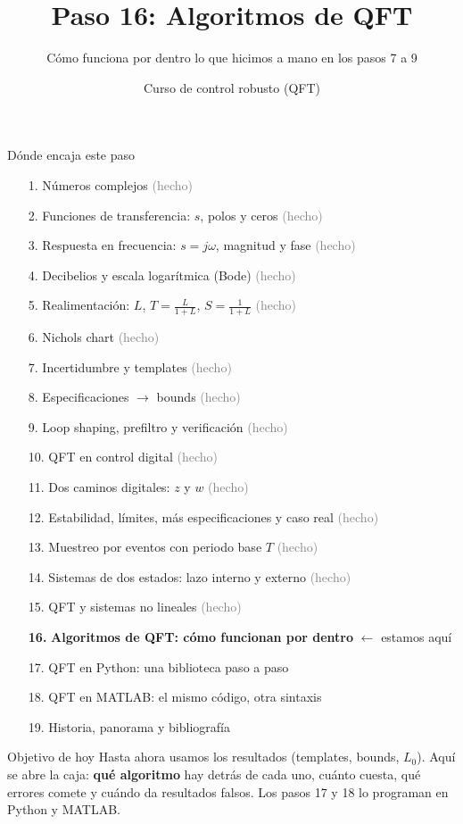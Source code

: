 \documentclass[aspectratio=169,11pt]{beamer}
\title[Algoritmos de QFT]{Paso 16: Algoritmos de QFT}
\subtitle{Cómo funciona por dentro lo que hicimos a mano en los pasos 7 a 9}
\author{Curso de control robusto (QFT)}
\date{}
\begin{document}
\begin{frame}\titlepage\end{frame}

\begin{frame}{Dónde encaja este paso}
  \tiny
  \begin{enumerate}\setlength{\itemsep}{-2pt}
    \item[1.] Números complejos \hfill \textcolor{gray}{(hecho)}
    \item[2.] Funciones de transferencia: $s$, polos y ceros \hfill \textcolor{gray}{(hecho)}
    \item[3.] Respuesta en frecuencia: $s=j\omega$, magnitud y fase \hfill \textcolor{gray}{(hecho)}
    \item[4.] Decibelios y escala logarítmica (Bode) \hfill \textcolor{gray}{(hecho)}
    \item[5.] Realimentación: $L$, $T=\frac{L}{1+L}$, $S=\frac{1}{1+L}$ \hfill \textcolor{gray}{(hecho)}
    \item[6.] Nichols chart \hfill \textcolor{gray}{(hecho)}
    \item[7.] Incertidumbre y templates \hfill \textcolor{gray}{(hecho)}
    \item[8.] Especificaciones $\rightarrow$ bounds \hfill \textcolor{gray}{(hecho)}
    \item[9.] Loop shaping, prefiltro y verificación \hfill \textcolor{gray}{(hecho)}
    \item[10.] QFT en control digital \hfill \textcolor{gray}{(hecho)}
    \item[11.] Dos caminos digitales: $z$ y $w$ \hfill \textcolor{gray}{(hecho)}
    \item[12.] Estabilidad, límites, más especificaciones y caso real \hfill \textcolor{gray}{(hecho)}
    \item[13.] Muestreo por eventos con periodo base $T$ \hfill \textcolor{gray}{(hecho)}
    \item[14.] Sistemas de dos estados: lazo interno y externo \hfill \textcolor{gray}{(hecho)}
    \item[15.] QFT y sistemas no lineales \hfill \textcolor{gray}{(hecho)}
    \item[\textbf{16.}] \textbf{Algoritmos de QFT: cómo funcionan por dentro} \hfill $\leftarrow$ estamos aquí
    \item[17.] QFT en Python: una biblioteca paso a paso
    \item[18.] QFT en MATLAB: el mismo código, otra sintaxis
    \item[19.] Historia, panorama y bibliografía
  \end{enumerate}
  \vspace{2pt}
  \begin{block}{Objetivo de hoy}
    \footnotesize
    Hasta ahora usamos los resultados (templates, bounds, $L_0$). Aquí se abre la caja: \textbf{qué algoritmo} hay detrás de cada uno, cuánto cuesta, qué errores comete y cuándo da resultados falsos. Los pasos 17 y 18 lo programan en Python y MATLAB.
  \end{block}
\end{frame}
\end{document}
